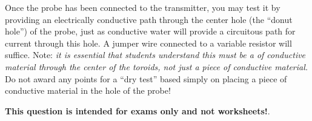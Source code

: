 Once the probe has been connected to the transmitter, you may test it by providing an electrically conductive path through the center hole (the ``donut hole'') of the probe, just as conductive water will provide a circuitous path for current through this hole.  A jumper wire connected to a variable resistor will suffice.  Note: {\it it is essential that students understand this must be a  of conductive material through the center of the toroids, not just a piece of conductive material.}  Do not award any points for a ``dry test'' based simply on placing a piece of conductive material in the hole of the probe!







{\bf This question is intended for exams only and not worksheets!}.



